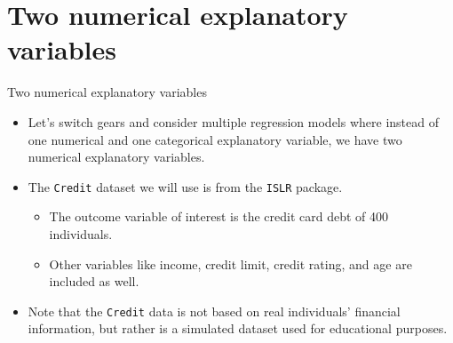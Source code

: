 \documentclass[
  ignorenonframetext,
]{beamer}
\providecommand{\tightlist}{%
  \setlength{\itemsep}{0pt}\setlength{\parskip}{0pt}}
\begin{document}
\section{Two numerical explanatory
variables}\label{two-numerical-explanatory-variables}

\begin{frame}[fragile]{Two numerical explanatory variables}
\label{two-numerical-explanatory-variables-1}
\begin{itemize}
\item
  Let's switch gears and consider multiple regression models where
  instead of one numerical and one categorical explanatory variable, we
  have two numerical explanatory variables.
\item
  The \texttt{Credit} dataset we will use is from the \texttt{ISLR}
  package.

  \begin{itemize}
  \tightlist
  \item
    The outcome variable of interest is the credit card debt of 400
    individuals.
  \item
    Other variables like income, credit limit, credit rating, and age
    are included as well.
  \end{itemize}
\item
  Note that the \texttt{Credit} data is not based on real individuals'
  financial information, but rather is a simulated dataset used for
  educational purposes.
\end{itemize}
\end{frame}
\end{document}
